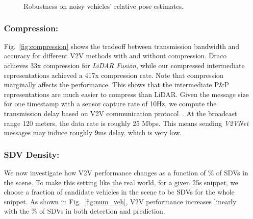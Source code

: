 \documentclass[runningheads]{llncs}
\newcommand{\pnp}{P\&P}
\newcommand{\figref}{Fig.~\ref}
\begin{document}
\begin{figure*}[t]
  \centering
  \hfill
\caption{Robustness on noisy vehicles' relative pose estimates.}
  \label{fig:pose_noise}
\end{figure*}

\subsubsection{Compression:}
\label{ssec:exp_comp}
\figref{fig:compression} shows the tradeoff between transmission bandwidth and accuracy for different V2V methods with and without compression.
Draco \cite{draco} achieves  33x  compression for \textit{LiDAR Fusion}, while our compressed intermediate representations achieved a 417x compression rate.
Note that compression marginally affects the performance.
This shows that the intermediate \pnp{}  representations
are much easier to compress than LiDAR.
Given the message size for one timestamp with a sensor capture rate of 10Hz, we compute the transmission delay based on V2V communication protocol~\cite{kenney2011dsrc}.
At the broadcast range 120 meters, the data rate is roughly 25 Mbps.
This means sending \textit{V2VNet} messages may induce roughly 9ms delay, which is very low.

\subsubsection{SDV Density:}
We now investigate how V2V performance changes as a function of \% of  SDVs in the scene.
To make this setting like the real world, for a given 25s snippet, we choose a fraction of candidate vehicles in the scene to be SDVs for the whole snippet.
As shown in \figref{fig:num_veh}, V2V
performance increases linearly with the \% of SDVs in both detection and prediction.
\end{document}
